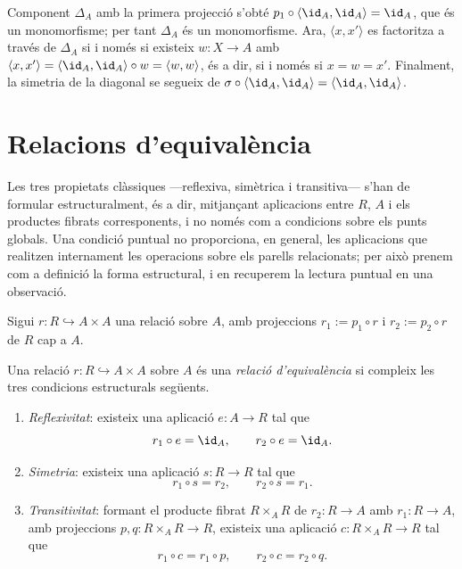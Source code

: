 \begin{prova}
Component \(\Delta_A\) amb la primera projecció s'obté \(p_1\circ\langle\id_A,\id_A\rangle=\id_A\), que és un monomorfisme; per tant \(\Delta_A\) és un monomorfisme. Ara, \(\langle x,x'\rangle\) es factoritza a través de \(\Delta_A\) si i només si existeix \(w\colon X\to A\) amb \(\langle x,x'\rangle=\langle\id_A,\id_A\rangle\circ w=\langle w,w\rangle\), és a dir, si i només si \(x=w=x'\). Finalment, la simetria de la diagonal se segueix de \(\sigma\circ\langle\id_A,\id_A\rangle=\langle\id_A,\id_A\rangle\).
\end{prova}

\section{Relacions d'equivalència}\label{sec:equivalencia}

Les tres propietats clàssiques ---reflexiva, simètrica i transitiva--- s'han de formular estructuralment, és a dir, mitjançant aplicacions entre \(R\), \(A\) i els productes fibrats corresponents, i no només com a condicions sobre els punts globals. Una condició puntual no proporciona, en general, les aplicacions que realitzen internament les operacions sobre els parells relacionats; per això prenem com a definició la forma estructural, i en recuperem la lectura puntual en una observació.

Sigui \(r\colon R\hookrightarrow A\times A\) una relació sobre \(A\), amb projeccions \(r_1:=p_1\circ r\) i \(r_2:=p_2\circ r\) de \(R\) cap a \(A\).

\begin{definicio}\label{def:equivalencia}
Una relació \(r\colon R\hookrightarrow A\times A\) sobre \(A\) és una \emph{relació d'equivalència} si compleix les tres condicions estructurals següents.
\begin{enumerate}
\item \emph{Reflexivitat}: existeix una aplicació \(e\colon A\to R\) tal que
\[
r_1\circ e=\id_A,
\qquad
r_2\circ e=\id_A.
\]
\item \emph{Simetria}: existeix una aplicació \(s\colon R\to R\) tal que
\[
r_1\circ s=r_2,
\qquad
r_2\circ s=r_1.
\]
\item \emph{Transitivitat}: formant el producte fibrat \(R\times_A R\) de \(r_2\colon R\to A\) amb \(r_1\colon R\to A\), amb projeccions \(p,q\colon R\times_A R\to R\), existeix una aplicació \(c\colon R\times_A R\to R\) tal que
\[
r_1\circ c=r_1\circ p,
\qquad
r_2\circ c=r_2\circ q.
\]
\end{enumerate}
\end{definicio}

